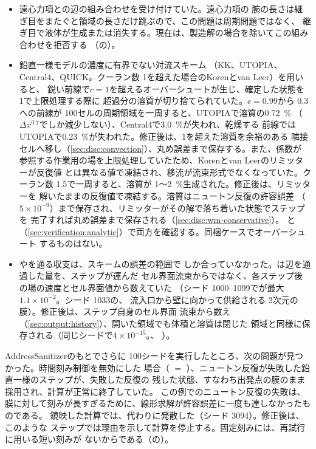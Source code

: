 \begin{itemize}
    膜で、リミッター付きのスキームも含めて溶質が$2.4\times10^{-14}$まで保存される。
    性質の要求値は$10^{-13}$である。
  \item 遠心力項との辺の組み合わせを受け付けていた。遠心力項の
    腕の長さは継ぎ目をまたぐと領域の長さだけ跳ぶので、この問題は周期問題ではなく、
    継ぎ目で液体が生成または消失する。現在は、製造解の場合を除いてこの組み合わせを拒否する
    （の）。
  \item 鉛直一様モデルの濃度に有界でない対流スキーム
    （KK、UTOPIA、Central4、QUICK。クーラン数 1を超えた場合のKorenとvan Leer）を用いると、
    鋭い前線で$c = 1$を超えるオーバーシュートが生じ、確定した状態を 1で上限処理する際に
    超過分の溶質が切り捨てられていた。$c = 0.99$から 0.3への前線が
    100セルの周期領域を一周すると、UTOPIAで溶質の\SI{0.72}{\percent}
    （$\Delta x^{0.7}$でしか減少しない）、Central4で\SI{3.0}{\percent}が失われ、乾燥する
    前線ではUTOPIAで\SI{0.23}{\percent}が失われた。修正後は、1を超えた溶質を余裕のある
    隣接セルへ移し（\cref{sec:disc:convection}）、丸め誤差まで保存する。また、係数が
    参照する作業用の場を上限処理していたため、Korenとvan Leerのリミッターが反復値
    とは異なる値で凍結され、移流が流束形式でなくなっていた。クーラン数
    1.5で一周すると、溶質が 1～\SI{2}{\percent}生成された。修正後は、リミッターを
    解いたままの反復値で凍結する。溶質はニュートン反復の許容誤差
    （$5\times10^{-9}$）まで保存され、リミッターがその解で落ち着いた状態でステップを
    完了すれば丸め誤差まで保存される（\cref{sec:disc:wm-conservative}）。
    と
    （\cref{sec:verification:analytic}）で両方を確認する。同梱ケースでオーバーシュート
    するものはない。
  \item {}やを通る収支は、スキームの誤差の範囲で
    しか合っていなかった。は辺を通過した量を、ステップが運んだ
    セル界面流束からではなく、各ステップ後の場の速度とセル界面値から数えていた
    （シード 1000--1099でが最大$1.1\times10^{-2}$。シード 1033の、
    流入口から壁に向かって供給される 2次元の膜）。修正後は、ステップ自身のセル界面
    流束から数え（\cref{sec:output:history}）、開いた領域でも体積と溶質は閉じた
    領域と同様に保存される（同じシードで$4\times10^{-15}$。、
    ）。
\end{itemize}

AddressSanitizerのもとでさらに 100シードを実行したところ、次の問題が見つかった。時間刻み制御を無効にした
場合（ $=$
）、ニュートン反復が失敗した鉛直一様のステップが、失敗した反復の
残した状態、すなわち出発点の膜のまま採用され、計算が正常に終了していた。
この例でのニュートン反復の失敗は、膜に対して刻みが長すぎるために、線形求解が許容誤差に一度も達しなかったものである。
鏡映した計算では、代わりに発散した（シード 3094）。修正後は、このような
ステップでは理由を示して計算を停止する。固定刻みには、再試行に用いる短い刻みが
ないからである（の）。

